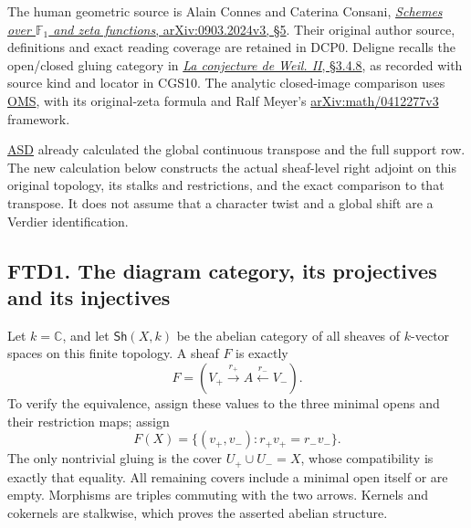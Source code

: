 The human geometric source is Alain Connes and Caterina Consani,
\href{https://arxiv.org/abs/0903.2024v3}{\emph{Schemes over
\(\mathbb F_1\) and zeta functions}, arXiv:0903.2024v3, §5}. Their
original author source, definitions and exact reading coverage are
retained in DCP0. Deligne recalls the open/closed gluing category in
\href{https://www.numdam.org/item/PMIHES_1980__52__137_0/}{\emph{La
conjecture de Weil. II}, §3.4.8}, as recorded with source kind and
locator in CGS10. The analytic closed-image comparison uses
\href{https://github.com/KokunoYumeto/zeta-function-research-reader/blob/36a82ecca98addb8a98b48204e349737856c7223/workbenches/splitzero-tandem/continuations/20260924-cohomology-weight-and-character-lifts/original-character-lifting/tau_lifting_weights_20260924/ORIGINAL_MELLIN_SPECTRAL_SYNTHESIS.md}{OMS},
with its original-zeta formula and Ralf Meyer's
\href{https://arxiv.org/abs/math/0412277v3}{arXiv:math/0412277v3}
framework.

\href{https://github.com/KokunoYumeto/zeta-function-research-reader/blob/36a82ecca98addb8a98b48204e349737856c7223/workbenches/splitzero-tandem/continuations/20260924-cohomology-weight-and-character-lifts/original-character-lifting/tau_lifting_weights_20260924/ACTUAL_SUPPORTED_DUALITY_INDEPENDENT.md}{ASD}
already calculated the global continuous transpose and the full support
row. The new calculation below constructs the actual sheaf-level right
adjoint on this original topology, its stalks and restrictions, and the
exact comparison to that transpose. It does not assume that a character
twist and a global shift are a Verdier identification.

\subsection{FTD1. The diagram category, its projectives and its
injectives}\label{ftd1.-the-diagram-category-its-projectives-and-its-injectives}

Let \(k=\mathbb C\), and let \(\mathsf{Sh}(X,k)\) be the abelian
category of all sheaves of \(k\)-vector spaces on this finite topology.
A sheaf \(F\) is exactly \[
F=(V_+\xrightarrow{r_+}A\xleftarrow{r_-}V_-).
\tag{FTD1.1}
\] To verify the equivalence, assign these values to the three minimal
opens and their restriction maps; assign \[
F(X)=\{(v_+,v_-):r_+v_+=r_-v_-\}.
\] The only nontrivial gluing is the cover \(U_+\cup U_-=X\), whose
compatibility is exactly that equality. All remaining covers include a
minimal open itself or are empty. Morphisms are triples commuting with
the two arrows. Kernels and cokernels are stalkwise, which proves the
asserted abelian structure.

